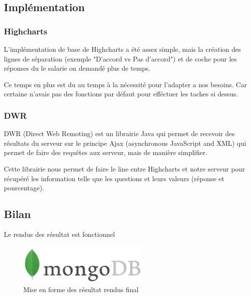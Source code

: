 \subsection{Implémentation}

\subsubsection{Highcharts}

L'implémentation de base de Highcharts a été assez simple, mais la création des lignes de séparation (exemple "D'accord vs Pas d'accord") et de coche pour les réponses du le salarie on demandé plus de temps. 

Ce temps en plus est du au temps à la nécessité pour l'adapter a nos besoins. Car certaine n'avais pas des fonctions par défaut pour efféctuer les taches si dessus.

\subsubsection{DWR}

DWR (Direct Web Remoting) est un librairie Java qui permet de recevoir des résultats du serveur sur le principe Ajax (asynchronous JavaScript and XML) qui permet de faire des requêtes aux serveur, mais de manière simplifier.

Cette librairie nous permet de faire le line entre Highcharts et notre serveur pour récupéré les information telle que les questions et leurs valeurs (réponse et pourcentage).

\subsection{Bilan}

Le rendus des résultat est fonctionnel 

\begin{figure}[H]
    \begin{center}
    \includegraphics[height=2.0cm]{img/mongodb}
    \end{center}
    \caption{Mise en forme des résultat rendus final}
\end{figure}